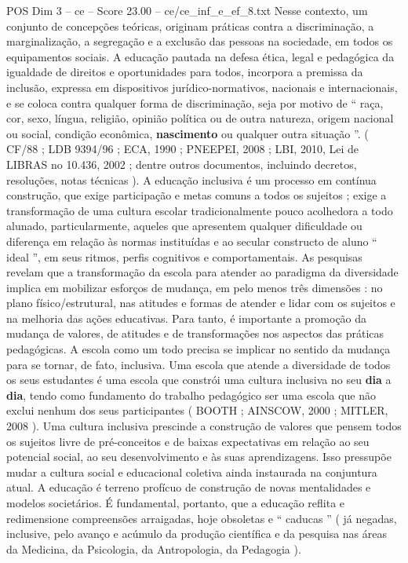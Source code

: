 \begin{textsample}{POS Dim 3 – ce – Score 23.00 – ce/ce\_inf\_e\_ef\_8.txt}
Nesse contexto, um conjunto de concepções teóricas, originam práticas contra a discriminação, a marginalização, a segregação e a exclusão das pessoas na sociedade, em todos os equipamentos sociais.
A educação pautada na defesa ética, legal e pedagógica da igualdade de direitos e oportunidades para todos, incorpora a premissa da inclusão, expressa em dispositivos jurídico-normativos, nacionais e internacionais, e se coloca contra qualquer forma de discriminação, seja por motivo de “ raça, cor, sexo, língua, religião, opinião política ou de outra natureza, origem nacional ou social, condição econômica, \textbf{nascimento} ou qualquer outra situação ”. ( CF/88 ; LDB 9394/96 ; ECA, 1990 ; PNEEPEI, 2008 ; LBI, 2010, Lei de LIBRAS no 10.436, 2002 ; dentre outros documentos, incluindo decretos, resoluções, notas técnicas ).
A educação inclusiva é um processo em contínua construção, que exige participação e metas comuns a todos os sujeitos ; exige a transformação de uma cultura escolar tradicionalmente pouco acolhedora a todo alunado, particularmente, aqueles que apresentem qualquer dificuldade ou diferença em relação às normas instituídas e ao secular constructo de aluno “ ideal ”, em seus ritmos, perfis cognitivos e comportamentais.
As pesquisas revelam que a transformação da escola para atender ao paradigma da diversidade implica em mobilizar esforços de mudança, em pelo menos três dimensões : no plano físico/estrutural, nas atitudes e formas de atender e lidar com os sujeitos e na melhoria das ações educativas.
Para tanto, é importante a promoção da mudança de valores, de atitudes e de transformações nos aspectos das práticas pedagógicas.
A escola como um todo precisa se implicar no sentido da mudança para se tornar, de fato, inclusiva.
Uma escola que atende a diversidade de todos os seus estudantes é uma escola que constrói uma cultura inclusiva no seu \textbf{dia} a \textbf{dia}, tendo como fundamento do trabalho pedagógico ser uma escola que não exclui nenhum dos seus participantes ( BOOTH ; AINSCOW, 2000 ; MITLER, 2008 ).
Uma cultura inclusiva prescinde a construção de valores que pensem todos os sujeitos livre de pré-conceitos e de baixas expectativas em relação ao seu potencial social, ao seu desenvolvimento e às suas aprendizagens.
Isso pressupõe mudar a cultura social e educacional coletiva ainda instaurada na conjuntura atual.
A educação é terreno profícuo de construção de novas mentalidades e modelos societários.
É fundamental, portanto, que a educação reflita e redimensione compreensões arraigadas, hoje obsoletas e “ caducas ” ( já negadas, inclusive, pelo avanço e acúmulo da produção científica e da pesquisa nas áreas da Medicina, da Psicologia, da Antropologia, da Pedagogia ).

\end{textsample}
